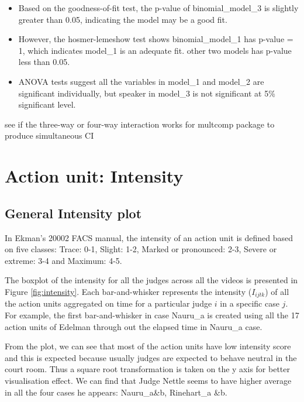 \documentclass{monashthesis}
\begin{document}
\begin{itemize}
\item
  Based on the goodness-of-fit test, the p-value of binomial\_model\_3 is slightly greater than 0.05, indicating the model may be a good fit.
\item
  However, the hosmer-lemeshow test shows binomial\_model\_1 has p-value = 1, which indicates model\_1 is an adequate fit. other two models has p-value less than 0.05.
\item
  ANOVA tests suggest all the variables in model\_1 and model\_2 are significant individually, but speaker in model\_3 is not significant at 5\% significant level.
\end{itemize}

see if the three-way or four-way interaction works for multcomp package to produce simultaneous CI

\hypertarget{action-unit-intensity}{%
\section{Action unit: Intensity}\label{action-unit-intensity}}

\hypertarget{general-intensity-plot}{%
\subsection{General Intensity plot}\label{general-intensity-plot}}

In Ekman's 20002 FACS manual, the intensity of an action unit is defined based on five classes: Trace: 0-1, Slight: 1-2, Marked or pronounced: 2-3, Severe or extreme: 3-4 and Maximum: 4-5.

The boxplot of the intensity for all the judges across all the videos is presented in Figure \ref{fig:intensity}. Each bar-and-whisker represents the intensity (\(I_{ijtk}\)) of all the action units aggregated on time for a particular judge \(i\) in a specific case \(j\). For example, the first bar-and-whisker in case Nauru\_a is created using all the 17 action units of Edelman through out the elapsed time in Nauru\_a case.

From the plot, we can see that most of the action units have low intensity score and this is expected because usually judges are expected to behave neutral in the court room. Thus a square root transformation is taken on the y axis for better visualisation effect. We can find that Judge Nettle seems to have higher average in all the four cases he appears: Nauru\_a\&b, Rinehart\_a \&b.
\end{document}
